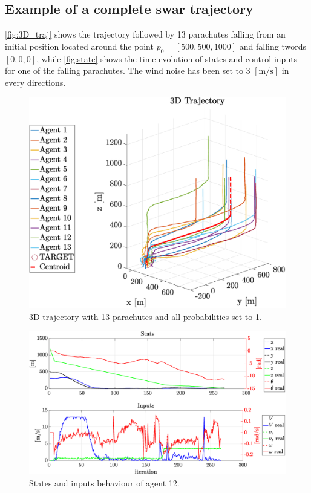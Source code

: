 \subsection{Example of a complete swar trajectory}
\autoref{fig:3D_traj} shows the trajectory followed by 13 parachutes falling from an initial position located around the point $p_0=[500, 500, 1000]$ and falling twords $[0, 0, 0]$, while \autoref{fig:state} shows the time evolution of states and control inputs for one of the falling parachutes. The wind noise has been set to 3 $\left[\si{\meter\per\second}\right]$ in every directions.\\
\begin{figure}[h]
    \centering
    \includegraphics[width=\columnwidth]{images/fig_3D.eps}
    \caption{3D trajectory with 13 parachutes and all probabilities set to 1.}
    \label{fig:3D_traj}
\end{figure}
\begin{figure}[h]
    \centering
    \includegraphics[width=\columnwidth]{images/fig_1.eps}
    \caption{States and inputs behaviour of agent 12.}
    \label{fig:state}
\end{figure}
